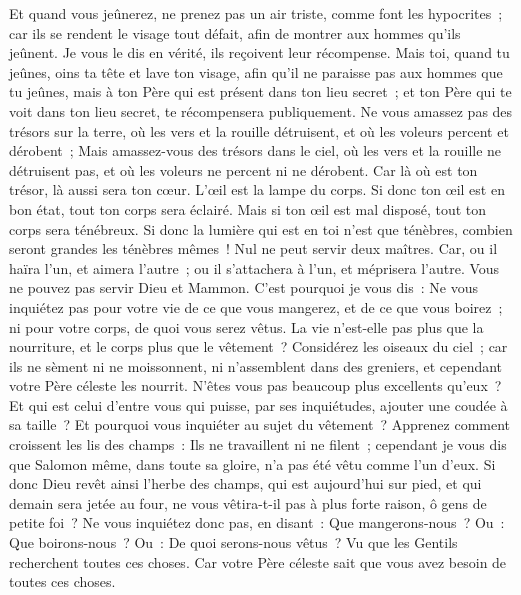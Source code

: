 \begin{multicols}{2}
Et quand vous jeûnerez, ne prenez pas un air triste, comme font les hypocrites~; car ils se rendent le visage tout défait, afin de montrer aux hommes qu'ils jeûnent. Je vous le dis en vérité, ils reçoivent leur récompense.
Mais toi, quand tu jeûnes, oins ta tête et lave ton visage,
afin qu'il ne paraisse pas aux hommes que tu jeûnes, mais à ton Père qui est présent dans ton lieu secret~; et ton Père qui te voit dans ton lieu secret, te récompensera publiquement.
Ne vous amassez pas des trésors sur la terre, où les vers et la rouille détruisent, et où les voleurs percent et dérobent~;
Mais amassez-vous des trésors dans le ciel, où les vers et la rouille ne détruisent pas, et où les voleurs ne percent ni ne dérobent.
Car là où est ton trésor, là aussi sera ton cœur.
L'œil est la lampe du corps. Si donc ton œil est en bon état, tout ton corps sera éclairé.
Mais si ton œil est mal disposé, tout ton corps sera ténébreux. Si donc la lumière qui est en toi n'est que ténèbres, combien seront grandes les ténèbres mêmes~!
Nul ne peut servir deux maîtres. Car, ou il haïra l'un, et aimera l'autre~; ou il s'attachera à l'un, et méprisera l'autre. Vous ne pouvez pas servir Dieu et Mammon.
C'est pourquoi je vous dis~: Ne vous inquiétez pas pour votre vie de ce que vous mangerez, et de ce que vous boirez~; ni pour votre corps, de quoi vous serez vêtus. La vie n'est-elle pas plus que la nourriture, et le corps plus que le vêtement~?
Considérez les oiseaux du ciel~; car ils ne sèment ni ne moissonnent, ni n'assemblent dans des greniers, et cependant votre Père céleste les nourrit. N'êtes vous pas beaucoup plus excellents qu'eux~?
Et qui est celui d'entre vous qui puisse, par ses inquiétudes, ajouter une coudée à sa taille~?
Et pourquoi vous inquiéter au sujet du vêtement~? Apprenez comment croissent les lis des champs~: Ils ne travaillent ni ne filent~;
cependant je vous dis que Salomon même, dans toute sa gloire, n'a pas été vêtu comme l'un d'eux.
Si donc Dieu revêt ainsi l'herbe des champs, qui est aujourd'hui sur pied, et qui demain sera jetée au four, ne vous vêtira-t-il pas à plus forte raison, ô gens de petite foi~?
Ne vous inquiétez donc pas, en disant~: Que mangerons-nous~? Ou~: Que boirons-nous~? Ou~: De quoi serons-nous vêtus~?
Vu que les Gentils recherchent toutes ces choses. Car votre Père céleste sait que vous avez besoin de toutes ces choses.

\end{multicols}

